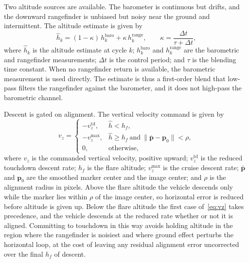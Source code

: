 Two altitude sources are available. The barometer is continuous but drifts, and the
downward rangefinder is unbiased but noisy near the ground and intermittent. The altitude
estimate is given by
\begin{equation}
  \hat{h}_k = (1-\kappa)\,h_k^{\mathrm{baro}} + \kappa\,h_k^{\mathrm{range}},
  \qquad \kappa = \frac{\Delta t}{\tau + \Delta t},
  \label{eq:alt}
\end{equation}
where $\hat{h}_k$ is the altitude estimate at cycle $k$; $h_k^{\mathrm{baro}}$ and
$h_k^{\mathrm{range}}$ are the barometric and rangefinder measurements; $\Delta t$ is the
control period; and $\tau$ is the blending time constant. When no rangefinder return is
available, the barometric measurement is used directly. The estimate is thus a
first-order blend that low-pass filters the rangefinder against the barometer, and it
does not high-pass the barometric channel.

Descent is gated on alignment. The vertical velocity command is given by
\begin{equation}
  v_z =
  \begin{cases}
    -v_z^{\mathrm{td}}, & \hat{h} < h_f,\\[2pt]
    -v_z^{\max}, & \hat{h} \ge h_f \ \text{and}\ \lVert \bar{\mathbf{p}} - \mathbf{p}_0 \rVert < \rho,\\[2pt]
    0, & \text{otherwise},
  \end{cases}
  \label{eq:vz}
\end{equation}
where $v_z$ is the commanded vertical velocity, positive upward; $v_z^{\mathrm{td}}$ is
the reduced touchdown descent rate; $h_f$ is the flare altitude; $v_z^{\max}$ is the
cruise descent rate; $\bar{\mathbf{p}}$ and $\mathbf{p}_0$ are the smoothed marker center
and the image center; and $\rho$ is the alignment radius in pixels. Above the flare
altitude the vehicle descends only while the marker lies within $\rho$ of the image
center, so horizontal error is reduced before altitude is given up. Below the flare
altitude the first case of~\eqref{eq:vz} takes precedence, and the vehicle descends at
the reduced rate whether or not it is aligned. Committing to touchdown in this way avoids
holding altitude in the region where the rangefinder is noisiest and where ground effect
perturbs the horizontal loop, at the cost of leaving any residual alignment error
uncorrected over the final $h_f$ of descent.

